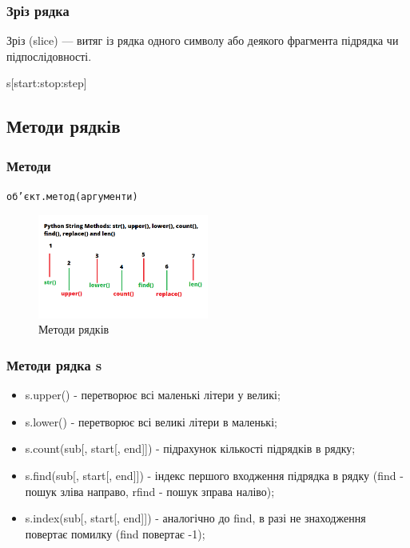 \begin{frame}
\frametitle{Зріз рядка}
Зріз (slice) — витяг із рядка одного символу або деякого фрагмента підрядка чи підпослідовності.

\begin{center}
\LARGE{s[start:stop:step]}
\end{center}
\end{frame}

\subsection{Методи рядків} 

\begin{frame}
\frametitle{Методи}
\begin{center}
\texttt{об'єкт.метод(аргументи)}
\end{center}
\begin{figure}
\begin{center}
 \includegraphics[width=0.5\textwidth]{pictures/python-string-methods.png}
\caption{Методи рядків}
\label{python-string-methods} 
\end{center}
\end{figure}
\end{frame}

\begin{frame}
\frametitle{Методи рядка s}
\begin{itemize}
  \item s.upper() - перетворює всі маленькі літери у великі;
  \item s.lower() - перетворює всі великі літери в маленькі;
  \item s.count(sub[, start[, end]]) - підрахунок кількості підрядків в рядку;
  \item s.find(sub[, start[, end]]) - індекс першого входження підрядка в рядку (find - пошук зліва направо, rfind - пошук зправа наліво);
  \item s.index(sub[, start[, end]]) - аналогічно до find, в разі не знаходження повертає помилку (find повертає -1);
\end{itemize}
\end{frame}

